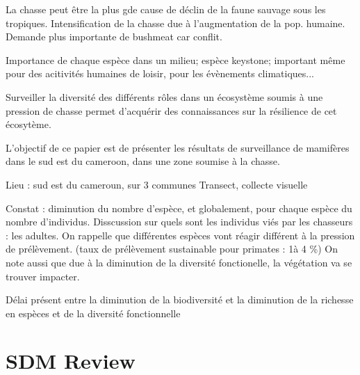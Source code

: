 \documentclass{article}
\begin{document}
La chasse peut être la plus gde cause de déclin de la faune sauvage sous les tropiques. Intensification de la chasse due à l'augmentation de la pop. humaine.
Demande plus importante de bushmeat car conflit.

Importance de chaque espèce dans un milieu; espèce keystone; important même pour des acitivités humaines de loisir, pour les évènements climatiques...

Surveiller la diversité des différents rôles dans un écosystème soumis à une pression de chasse permet d'acquérir des connaissances sur la résilience de cet écosytème.

L'objectif de ce papier est de présenter les résultats de surveillance de mamifères dans le sud est du cameroon, dans une zone soumise à la chasse.

Lieu : sud est du cameroun, sur 3 communes
Transect, collecte visuelle

Constat : diminution du nombre d'espèce, et globalement, pour chaque espèce du nombre d'individus.
Disscussion sur quels sont les individus viés par les chasseurs : les adultes.
On rappelle que différentes espèces vont réagir différent à la pression de prélèvement. (taux de prélèvement sustainable pour primates : 1à 4 \%)
On note aussi que due à la diminution de la diversité fonctionelle, la végétation va se trouver impacter.

Délai présent entre la diminution de la biodiversité et la diminution de la richesse en espèces et de la diversité fonctionnelle



\section{SDM Review}
\end{document}

